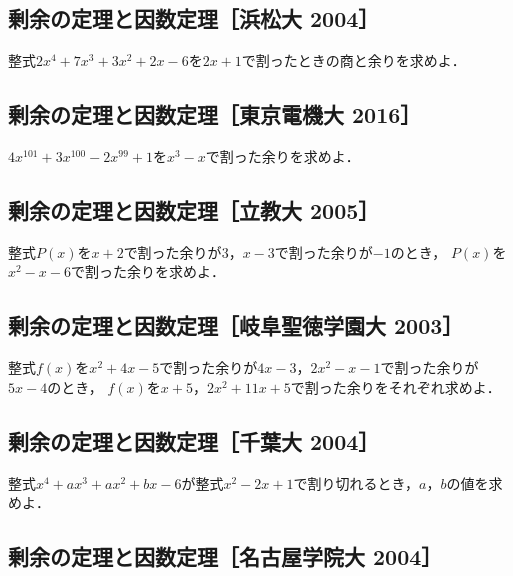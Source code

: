 \documentclass[../../ms_q.tex]{subfiles}
\begin{document}
\subsection{剰余の定理と因数定理［浜松大 2004］}

整式$2x^4+7x^3+3x^2+2x-6$を$2x+1$で割ったときの商と余りを求めよ．

\vspace{2cm}
\vfill

\subsection{剰余の定理と因数定理［東京電機大 2016］}

$4x^{101}+3x^{100}-2x^{99}+1$を$x^3-x$で割った余りを求めよ．

\vspace{2cm}
\vfill

\subsection{剰余の定理と因数定理［立教大 2005］}

整式$P(x)$を$x+2$で割った余りが$3$，$x-3$で割った余りが$-1$のとき，
$P(x)$を$x^2- x - 6$で割った余りを求めよ．

\vspace{2cm}
\vfill

\subsection{剰余の定理と因数定理［岐阜聖徳学園大 2003］}

整式$f(x)$を$x^2+4x-5$で割った余りが$4x-3$，$2x^2-x-1$で割った余りが$5x-4$のとき，
$f(x)$を$x+5$，$2x^2+11x+5$で割った余りをそれぞれ求めよ．

\vspace{2cm}
\vfill

\subsection{剰余の定理と因数定理［千葉大 2004］}

整式$x^4+ax^3+ax^2+bx-6$が整式$x^2-2x+1$で割り切れるとき，$a$，$b$の値を求めよ．

\vspace{2cm}
\vfill

\subsection{剰余の定理と因数定理［名古屋学院大 2004］}
\end{document}

